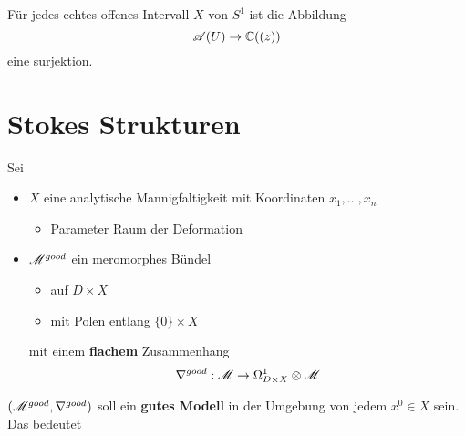 \begin{comment}
  Damit bekommt man die Garbe $\cA$ auf $S^1$, die zu einem offenem Intervall
  $U$ von $S^1$ die Menge $\cA(U)$ der Funktionen mit asymptotischer
  Entwicklung auf dem entsprechendem Sektor zuordnet.

  \TODO[The sheaf $\sA$]
\end{comment}

\begin{lem}
  Für jedes echtes offenes Intervall $X$ von $S^1$ ist die Abbildung
  \[
    \mathscr{A}(U)\to \mathbb{C}((z))
  \]
  eine surjektion.
\end{lem}
\begin{thm}
  \TODO
\end{thm}
\section{Stokes Strukturen} %
Sei
\begin{itemize}
  \item $X$ eine analytische Mannigfaltigkeit mit Koordinaten $x_1,\dots,x_n$
    \begin{itemize}
      \item Parameter Raum der Deformation
    \end{itemize}
  \item $\mathscr{M}^{good}$ ein meromorphes Bündel
    \begin{itemize}
      \item auf $D\times X$
      \item mit Polen entlang $\{0\}\times X$
    \end{itemize}
    mit einem \textbf{flachem} Zusammenhang
    \[
      \nabla^{good}:\mathscr{M}\to\Omega_{D\times X}^1\otimes \mathscr{M}
    \]
\end{itemize}
$(\mathscr{M}^{good},\nabla^{good})$ soll ein \textbf{gutes Modell} in der Umgebung von
jedem $x^0\in X$ sein. Das bedeutet \TODO

